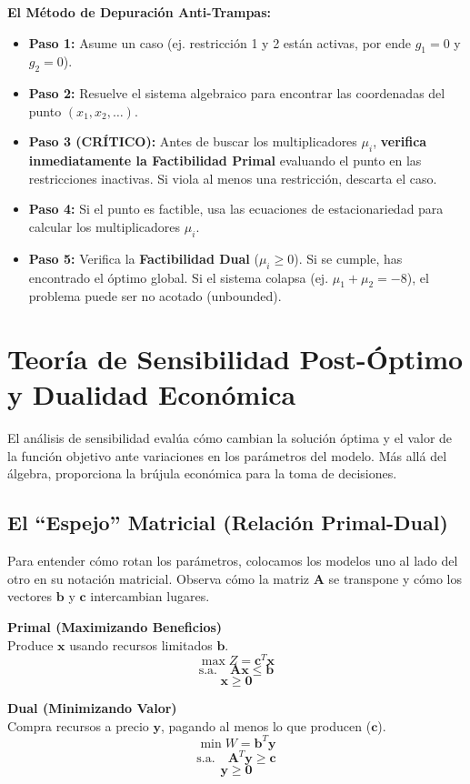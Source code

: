 \documentclass{article}
\begin{document}
	\textbf{El Método de Depuración Anti-Trampas:}
	\begin{itemize}
		\item \textbf{Paso 1:} Asume un caso (ej. restricción 1 y 2 están activas, por ende $g_1 = 0$ y $g_2 = 0$).
		\item \textbf{Paso 2:} Resuelve el sistema algebraico para encontrar las coordenadas del punto $(x_1, x_2, \dots)$.
		\item \textbf{Paso 3 (CRÍTICO):} Antes de buscar los multiplicadores $\mu_i$, \textbf{verifica inmediatamente la Factibilidad Primal} evaluando el punto en las restricciones inactivas. Si viola al menos una restricción, descarta el caso.
		\item \textbf{Paso 4:} Si el punto es factible, usa las ecuaciones de estacionariedad para calcular los multiplicadores $\mu_i$.
		\item \textbf{Paso 5:} Verifica la \textbf{Factibilidad Dual} ($\mu_i \geq 0$). Si se cumple, has encontrado el óptimo global. Si el sistema colapsa (ej. $\mu_1 + \mu_2 = -8$), el problema puede ser no acotado (unbounded).
	\end{itemize}
	
	\newpage
	
	\section{Teoría de Sensibilidad Post-Óptimo y Dualidad Económica}
	El análisis de sensibilidad evalúa cómo cambian la solución óptima y el valor de la función objetivo ante variaciones en los parámetros del modelo. Más allá del álgebra, proporciona la brújula económica para la toma de decisiones.
	
	\subsection{El ``Espejo'' Matricial (Relación Primal-Dual)}
	Para entender cómo rotan los parámetros, colocamos los modelos uno al lado del otro en su notación matricial. Observa cómo la matriz $\mathbf{A}$ se transpone y cómo los vectores $\mathbf{b}$ y $\mathbf{c}$ intercambian lugares.
	
	
	\begin{minipage}[t]{0.45\textwidth}
		\textbf{Primal (Maximizando Beneficios)}\\
		Produce $\mathbf{x}$ usando recursos limitados $\mathbf{b}$.
		$$\max Z = \mathbf{c}^T \mathbf{x}$$
		$$\text{s.a.} \quad \mathbf{A} \mathbf{x} \leq \mathbf{b}$$
		$$\mathbf{x} \geq \mathbf{0}$$
	\end{minipage}
	\hfill
	\begin{minipage}[t]{0.45\textwidth}
		\textbf{Dual (Minimizando Valor)}\\
		Compra recursos a precio $\mathbf{y}$, pagando al menos lo que producen ($\mathbf{c}$).
		$$\min W = \mathbf{b}^T \mathbf{y}$$
		$$\text{s.a.} \quad \mathbf{A}^T \mathbf{y} \geq \mathbf{c}$$
		$$\mathbf{y} \geq \mathbf{0}$$
	\end{minipage}
	
\end{document}
